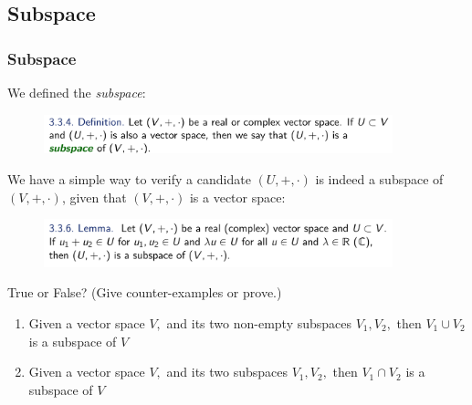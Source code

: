 \documentclass[10pt, t]{beamer}
\renewcommand{\emph}[1]{{\color{themecolor}\textsl{#1}}}
\begin{document}
\subsection{Subspace}
\begin{frame}
    \frametitle{Subspace}

    We defined the \emph{subspace}:
    \begin{figure}[H]
        \centering
        \includegraphics[width=0.9\textwidth]{2020-11-17-20-03-23.png}
    \end{figure}

    We have a simple way to verify a candidate $(U,+,\cdot)$ is indeed a subspace of $(V,+,\cdot)$, given that $(V,+,\cdot)$ is a vector space:
    \begin{figure}[H]
        \centering
        \includegraphics[width=0.9\textwidth]{2020-11-17-20-07-20.png}
    \end{figure}
    True or False? (Give counter-examples or prove.)
    \begin{enumerate}
        \item 
        Given a vector space $V,$ and its two non-empty subspaces $V_{1}, V_{2},$ then $V_{1} \cup V_{2}$ is a subspace of $V$
        \item
        Given a vector space $V,$ and its two subspaces $V_{1}, V_{2},$ then $V_{1} \cap V_{2}$ is a subspace of $V$
    \end{enumerate}
\end{frame}
\end{document}
